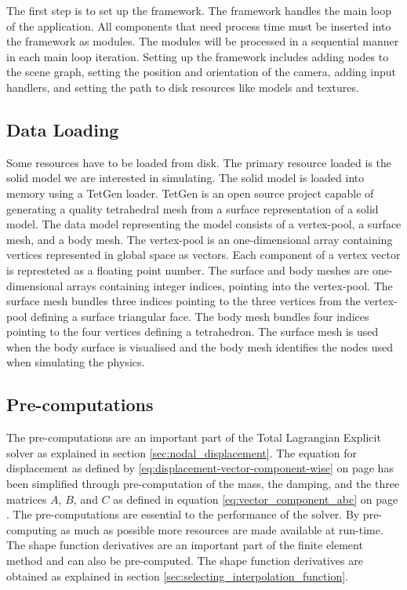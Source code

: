 The first step is to set up the \openengine{} framework. The framework
handles the main loop of the application. All components that need
process time must be inserted into the framework as modules. The modules will be
processed in a sequential manner in each main loop iteration. Setting
up the framework includes adding 
nodes to the scene graph, setting the position and orientation of the
camera, adding input handlers, and setting the path to
disk resources like models and textures.


\subsection*{Data Loading}
\label{sec:data-model}
Some resources have to be loaded from disk. The primary 
resource loaded is the solid model we are interested in
simulating. The solid model is loaded into memory using a TetGen
loader. TetGen is
an open source project capable of generating a quality tetrahedral mesh
from a surface representation of a solid model. 
%
The data model representing the model consists of a vertex-pool, a
surface mesh, and a body mesh. The vertex-pool is an one-dimensional
array containing vertices represented in global space as vectors.
Each component of a vertex vector is represteted as a floating point
number. The surface and body meshes are one-dimensional arrays
containing integer indices, pointing into the vertex-pool.
The surface mesh bundles three indices pointing to the three vertices
from the vertex-pool defining a surface triangular face.
The body mesh bundles four indices pointing to the four vertices
defining a tetrahedron.
%
The surface mesh is used when the body surface is visualised and the body
mesh identifies the nodes used when simulating the physics. 

\subsection*{Pre-computations}
\label{sec:precompuations}
The pre-computations are an important part of the Total Lagrangian Explicit
solver as explained in section \vref{sec:nodal_displacement}. The
equation for displacement as defined by \eqref{eq:displacement-vector-component-wise} on
page \pageref{eq:displacement-vector-component-wise} has been
simplified through pre-computation of the mass, the damping, and the
three matrices $A$, $B$, and $C$ as defined in equation
\eqref{eq:vector_component_abc} on page
\pageref{eq:vector_component_abc}. The pre-computations are essential
to the performance of the solver. By 
pre-computing as much as possible more resources are made available at run-time.
%
The shape function derivatives are an important part of the finite
element method and can also be
pre-computed. The shape function derivatives are obtained as explained
in section \vref{sec:selecting_interpolation_function}.\\

